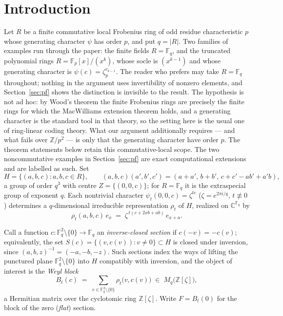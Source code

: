 \documentclass[11pt]{article}
\theoremstyle{plain}
\theoremstyle{definition}
\newcommand{\FF}{\mathbb F}
\newcommand{\ZZ}{\mathbb Z}
\begin{document}
\section{Introduction}

Let $R$ be a finite commutative local Frobenius ring of odd residue
characteristic $p$ whose generating character $\psi$ has order $p$, and put
$q=|R|$. Two families of examples run through the paper: the finite fields
$R=\FF_q$, and the truncated polynomial rings $R=\FF_p[x]/(x^k)$, whose socle
is $(x^{k-1})$ and whose generating character is $\psi(c)=\zeta_p^{c_{k-1}}$.
The reader who prefers may take $R=\FF_q$ throughout; nothing in the argument
uses invertibility of nonzero elements, and Section~\ref{sec:pf} shows the
distinction is invisible to the result. The hypothesis is not ad hoc: by Wood's
theorem \cite{Wood} the finite Frobenius rings are precisely the finite rings
for which the MacWilliams extension theorem holds, and a generating character
is the standard tool in that theory, so the setting here is the usual one of
ring-linear coding theory. What our argument additionally requires --- and what
fails over $\ZZ/p^2$ --- is only that the generating character have order $p$.
The theorem statements below retain this commutative-local scope.  The two
noncommutative examples in Section~\ref{sec:pf} are exact computational
extensions and are labelled as such.
Set
\[
H=\bigl\{(a,b,c):a,b,c\in R\bigr\},\qquad
(a,b,c)(a',b',c')=(a+a',\,b+b',\,c+c'-ab'+a'b),
\]
a group of order $q^3$ with centre $Z=\{(0,0,c)\}$; for $R=\FF_q$ it is the
extraspecial group of exponent $q$. Each nontrivial character $\psi_t(0,0,c)=\zeta^{tc}$
($\zeta=e^{2\pi i/q}$, $t\not\equiv0$) determines a $q$-dimensional irreducible
representation $\rho_t$ of $H$, realized on $\mathbb C^{\FF_q}$ by
\begin{equation}\label{eq:rho}
\rho_t(a,b,c)\,e_x \;=\; \zeta^{\,t(c+2xb+ab)}\,e_{x+a}.
\end{equation}

Call a function $c:\FF_q^2\setminus\{0\}\to\FF_q$ an \emph{inverse-closed
section} if $c(-v)=-c(v)$; equivalently, the set
$S(c)=\{(v,c(v)):v\neq0\}\subset H$ is closed under inversion, since
$(a,b,z)^{-1}=(-a,-b,-z)$. Such sections index the ways of lifting the
punctured plane $\FF_q^2\setminus\{0\}$ into $H$ compatibly with inversion,
and the object of interest is the \emph{Weyl block}
\[
B_t(c)\;=\;\sum_{v\in\FF_q^2\setminus\{0\}}\rho_t\bigl(v,c(v)\bigr)
\;\in\; M_q\bigl(\ZZ[\zeta]\bigr),
\]
a Hermitian matrix over the cyclotomic ring $\ZZ[\zeta]$. Write $F=B_t(0)$ for
the block of the zero (\emph{flat}) section.
\end{document}
